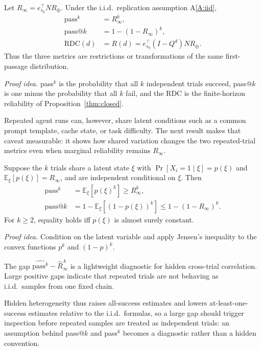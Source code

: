 \begin{theorem}
\label{thm:unify}
Let $R_\infty=e_{s_0}^{\top}NR_\oplus$. Under the i.i.d.\
replication assumption A\ref{A:iid},
\begin{align}
\mathrm{pass}^{k} &= R_\infty^{k}, \label{eq:t3-passk}\\
\mathrm{pass}@k  &= 1-(1-R_\infty)^{k}, \label{eq:t3-passatk}\\
\mathrm{RDC}(d)  &= R(d)
 = e_{s_0}^{\top}(I-Q^{d})NR_\oplus. \label{eq:t3-rdc}
\end{align}
Thus the three metrics are restrictions or transformations of the
same first-passage distribution.
\end{theorem}

\noindent\emph{Proof idea.}
pass$^k$ is the probability that all $k$ independent trials succeed,
pass$@k$ is one minus the probability that all $k$ fail, and the RDC is
the finite-horizon reliability of Proposition~\ref{thm:closed}.

Repeated agent runs can, however, share latent conditions such as a
common prompt template, cache state, or task difficulty. The next
result makes that caveat measurable: it shows how shared variation
changes the two repeated-trial metrics even when marginal reliability
remains $R_\infty$.

\begin{theorem}
\label{thm:corr}
Suppose the $k$ trials share a latent state $\xi$ with
$\Pr[X_i=1\mid\xi]=p(\xi)$ and
$\mathbb{E}_\xi[p(\xi)]=R_\infty$, and are independent conditional on
$\xi$. Then
\begin{align}
\mathrm{pass}^{k} &= \mathbb{E}_\xi[p(\xi)^k]
                  \ge R_\infty^k, \label{eq:t3p-passk}\\
\mathrm{pass}@k  &= 1-\mathbb{E}_\xi[(1-p(\xi))^k]
                  \le 1-(1-R_\infty)^k. \label{eq:t3p-passatk}
\end{align}
For $k\ge2$, equality holds iff $p(\xi)$ is almost surely constant.
\end{theorem}

\noindent\emph{Proof idea.}
Condition on the latent variable and apply Jensen's inequality to
the convex functions $p^k$ and $(1-p)^k$.

\begin{corollary}[Diagnostic]
\label{cor:diag}
The gap
$\widehat{\mathrm{pass}^{k}}-\hat R_\infty^{\,k}$ is a
lightweight diagnostic for hidden cross-trial correlation. Large
positive gaps indicate that repeated trials are not behaving as
i.i.d.\ samples from one fixed chain.
\end{corollary}

Hidden heterogeneity thus raises all-success estimates and lowers
at-least-one-success estimates relative to the i.i.d.\ formulas, so a
large gap should trigger inspection before repeated samples are treated
as independent trials: an assumption behind pass$@k$ and pass$^k$
becomes a diagnostic rather than a hidden convention.
